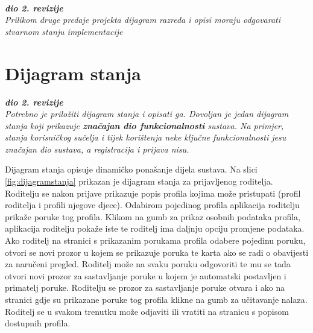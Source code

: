 			\

			\textbf{\textit{dio 2. revizije}}\\			
			
			\textit{Prilikom druge predaje projekta dijagram razreda i opisi moraju odgovarati stvarnom stanju implementacije}
			
			
			
			\eject
		
		\section{Dijagram stanja}
			
			
			\textbf{\textit{dio 2. revizije}}\\
			
			\textit{Potrebno je priložiti dijagram stanja i opisati ga. Dovoljan je jedan dijagram stanja koji prikazuje \textbf{značajan dio funkcionalnosti} sustava. Na primjer, stanja korisničkog sučelja i tijek korištenja neke ključne funkcionalnosti jesu značajan dio sustava, a registracija i prijava nisu. }
			
			Dijagram stanja opisuje dinamičko ponašanje dijela sustava. Na slici \ref{fig:dijagramstanja} prikazan je dijagram stanja za prijavljenog roditelja. Roditelju se nakon prijave prikazuje popis profila kojima može pristupati (profil roditelja i profili njegove djece). Odabirom pojedinog profila aplikacija roditelju prikaže poruke tog profila. Klikom na gumb za prikaz osobnih podataka profila, aplikacija roditelju pokaže iste te roditelj ima daljnju opciju promjene podataka. Ako roditelj na stranici s prikazanim porukama profila odabere pojedinu poruku, otvori se novi prozor u kojem se prikazuje poruka te karta ako se radi o obavijesti za naručeni pregled. Roditelj može na svaku poruku odgovoriti te mu se tada otvori novi prozor za sastavljanje poruke u kojem je automatski postavljen i primatelj poruke. Roditelju se prozor za sastavljanje poruke otvara i ako na stranici gdje su prikazane poruke tog profila klikne na gumb za učitavanje nalaza. Roditelj se u svakom trenutku može odjaviti ili vratiti na stranicu s popisom dostupnih profila.
			
